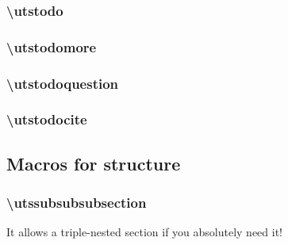 \subsubsection{\textbackslash utstodo}


\subsubsection{\textbackslash utstodomore}
\utstodomore


\subsubsection{\textbackslash utstodoquestion}


\subsubsection{\textbackslash utstodocite}
\utstodocite 




\subsection{Macros for structure}
\subsubsection{\textbackslash utssubsubsubsection}
It allows a triple-nested section if you absolutely need it!
\\
\\
